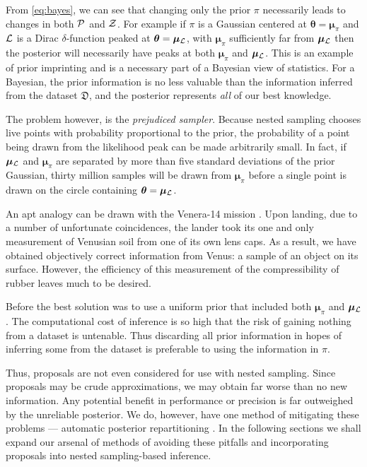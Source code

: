 \documentclass[usenatbib]{mnras}
\begin{document}
From \cref{eq:bayes}, we can see that changing only the prior $\pi$
necessarily leads to changes in both ${\cal P}$ and ${\cal Z}$. For
example if $\pi$ is a Gaussian centered at
$\bm{\theta}=\bm{\mu}_{\pi}$ and ${\cal L}$ is a Dirac
$\delta$-function peaked at $\bm{\theta}=\bm{\mu}_{{\cal L}}$, with
$\bm{\mu}_{\pi}$ sufficiently far from $\bm{\mu}_{{\cal L}}$ then the
posterior will necessarily have peaks at both $\bm{\mu}_{\pi}$ and
$\bm{\mu}_{{\cal L}}$. This is an example of prior imprinting and is a
necessary part of a Bayesian view of statistics. For a Bayesian, the
prior information is no less valuable than the information inferred
from the dataset \(\mathfrak{D}\), and the posterior represents
\emph{all} of our best knowledge.

The problem however, is the \emph{prejudiced sampler}. Because nested
sampling chooses live points with probability proportional to the
prior, the probability of a point being drawn from the likelihood peak
can be made arbitrarily small. In fact, if $\bm{\mu}_{{\cal L}}$ and
$\bm{\mu}_{\pi}$ are separated by more than five standard deviations
of the prior Gaussian, thirty million samples will be drawn from
$\bm{\mu}_{\pi}$ before a single point is drawn on the circle
containing $\bm{\theta} = \bm{\mu}_{{\cal L}}$.

An apt analogy can be drawn with the Venera-14 mission
\citep{siddiqi2018beyond}. Upon landing, due to a number of
unfortunate coincidences, the lander took its one and only measurement
of Venusian soil from one of its own lens caps. As a result, we have
obtained objectively correct information from Venus: a sample of an
object on its surface. However, the efficiency of this measurement of
the compressibility of rubber leaves much to be desired. 

Before \cite{chen-ferroz-hobson} the best solution was to use a
uniform prior that included both $\bm{\mu}_{\pi}$ and
$\bm{\mu}_{{\cal L}}$. The computational cost of inference is so high
that the risk of gaining nothing from a dataset is untenable. Thus
discarding all prior information in hopes of inferring some from the
dataset is preferable to using the information in $\pi$. 

Thus, proposals are not even considered for use with nested sampling.
Since proposals may be crude approximations, we may obtain far worse
than no new information.  Any potential benefit in performance or
precision is far outweighed by the unreliable posterior.  We do,
however, have one method of mitigating these problems --- automatic
posterior repartitioning \citep{chen-ferroz-hobson}. In the following
sections we shall expand our arsenal of methods of avoiding these
pitfalls and incorporating proposals into nested sampling-based
inference.
\end{document}

